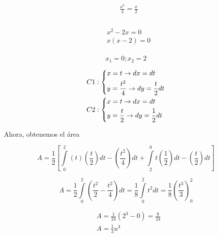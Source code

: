 \documentclass[12pt]{article}
\begin{document}
\begin{align}
  & \frac{{{x}^{2}}}{4}=\frac{x}{2} \\ 
 &  \\ 
\end{align}

\begin{align}
  & {{x}^{2}}-2x=0 \\ 
 & x(x-2)=0 \\ 
\end{align}

\[{{x}_{1}}=0;{{x}_{2}}=2\]

\[\begin{gathered}
  C1:\left\{ \begin{gathered}
  x = t \to dx = dt \hfill \\
  y = \frac{{{t^2}}}{4} \to dy = \frac{t}{2}dt \hfill \\ 
\end{gathered}  \right. \hfill \\
  C2:\left\{ \begin{gathered}
  x = t \to dx = dt \hfill \\
  y = \frac{t}{2} \to dy = \frac{1}{2}dt \hfill \\ 
\end{gathered}  \right. \hfill \\ 
\end{gathered} \]


Ahora, obtenemos el área

\[A=\frac{1}{2}\left[ \int\limits_{0}^{2}{(t)(\frac{t}{2})dt-(\frac{{{t}^{2}}}{4})dt+\int\limits_{2}^{0}{t(\frac{1}{2})dt-(\frac{t}{2})dt}} \right]\]

\[A=\frac{1}{2}\int\limits_{0}^{2}{\left( \frac{{{t}^{2}}}{2}-\frac{{{t}^{2}}}{4} \right)}dt=\frac{1}{8}\int\limits_{0}^{2}{{{t}^{2}}dt=\frac{1}{8}\left( \frac{{{t}^{3}}}{3} \right)_{0}^{2}}\]

\begin{align}
  & A=\frac{1}{24}({{2}^{3}}-0)=\frac{8}{24} \\ 
 & A=\frac{1}{3}{{u}^{3}} \\ 
\end{align}
\end{document}
